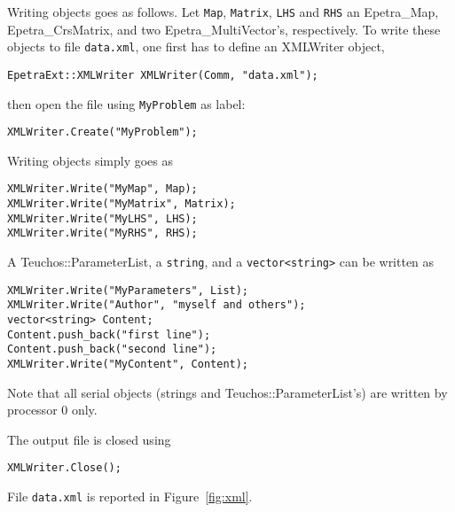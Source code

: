\documentclass[11pt,relax]{SANDreport}
\begin{document}
Writing objects goes as follows. Let \verb!Map!, \verb!Matrix!, \verb!LHS! and
\verb!RHS! an 
Epetra\_Map, Epetra\_CrsMatrix, and two Epetra\_MultiVector's, respectively.
To write these objects to file \verb!data.xml!, one first has to define an
XMLWriter object,
\begin{verbatim}
EpetraExt::XMLWriter XMLWriter(Comm, "data.xml");
\end{verbatim}
then open the file using \verb!MyProblem! as label:
\begin{verbatim}
XMLWriter.Create("MyProblem");
\end{verbatim}
Writing objects simply goes as
\begin{verbatim}
XMLWriter.Write("MyMap", Map);
XMLWriter.Write("MyMatrix", Matrix);
XMLWriter.Write("MyLHS", LHS);
XMLWriter.Write("MyRHS", RHS);
\end{verbatim}
A Teuchos::ParameterList, a \verb!string!, and a \verb!vector<string>! can be written as
\begin{verbatim}
XMLWriter.Write("MyParameters", List);
XMLWriter.Write("Author", "myself and others");
vector<string> Content;
Content.push_back("first line");
Content.push_back("second line");
XMLWriter.Write("MyContent", Content);
\end{verbatim}
Note that all serial objects (strings and Teuchos::ParameterList's) are
written by processor 0 only.

The output file is closed using
\begin{verbatim}
XMLWriter.Close();
\end{verbatim}
File \verb!data.xml! is reported in Figure~\ref{fig:xml}.
\end{document}
